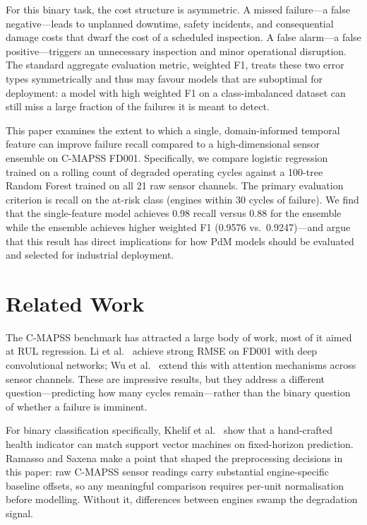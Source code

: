 \documentclass[10pt,twocolumn]{article}
\begin{document}
For this binary task, the cost structure is asymmetric.
A missed failure---a false negative---leads to unplanned downtime, safety incidents,
and consequential damage costs that dwarf the cost of a scheduled inspection.
A false alarm---a false positive---triggers an unnecessary inspection and minor
operational disruption.
The standard aggregate evaluation metric, weighted F1, treats these two error types
symmetrically and thus may favour models that are suboptimal for deployment: a model
with high weighted F1 on a class-imbalanced dataset can still miss a large fraction of
the failures it is meant to detect.

This paper examines the extent to which a single, domain-informed temporal feature
can improve failure recall compared to a high-dimensional sensor ensemble on C-MAPSS
FD001.
Specifically, we compare logistic regression trained on a rolling count of
degraded operating cycles against a 100-tree Random Forest trained on all 21 raw
sensor channels.
The primary evaluation criterion is recall on the at-risk class (engines within 30
cycles of failure).
We find that the single-feature model achieves 0.98 recall versus 0.88 for the ensemble
while the ensemble achieves higher weighted F1 (0.9576 vs.\ 0.9247)---and argue that
this result has direct implications for how PdM models should be evaluated and selected
for industrial deployment.


\section{Related Work}
\label{sec:related}

The C-MAPSS benchmark \cite{saxena2008damage} has attracted a large body of work, most
of it aimed at RUL regression.
Li et al.\ \cite{li2018remaining} achieve strong RMSE on FD001 with deep convolutional
networks; Wu et al.\ \cite{wu2021temporal} extend this with attention mechanisms across
sensor channels.
These are impressive results, but they address a different question---predicting how
many cycles remain---rather than the binary question of whether a failure is imminent.

For binary classification specifically, Khelif et al.\ \cite{khelif2017direct} show
that a hand-crafted health indicator can match support vector machines on fixed-horizon
prediction.
Ramasso and Saxena \cite{ramasso2014application} make a point that shaped the
preprocessing decisions in this paper: raw C-MAPSS sensor readings carry substantial
engine-specific baseline offsets, so any meaningful comparison requires per-unit
normalisation before modelling.
Without it, differences between engines swamp the degradation signal.
\end{document}
